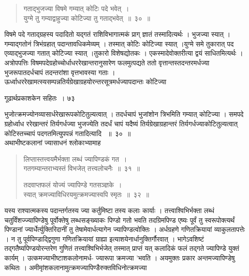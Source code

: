 \documentclass[11pt, openany]{book}
\begin{document}
\begin{quote}
{\ssi गताद्भुजज्या विषमे गम्यात् कोटिः पदे भवेत्~।\\
युग्मे तु गम्याद्वाहुज्या कोटिज्या तु गताद्भवेत्~॥~३०~॥ }
\end{quote}

\begin{sloppypar}
विषमे पदे गताद्ग्रहस्य पदादितो यद्गतं राशिविभागात्मकं प्राग् ज्ञातं तस्मादित्यर्थः । भुजज्या स्यात् । गम्याद्गतोनं त्रिभंग्रहात् पदान्तावधिकमेव्यम् । तस्मात् कोटिः कोटिज्या स्यात् ।युग्मे समे तुकारात् पद एव्याद्भुजज्या गतात् कोटिज्या स्यात् ।तुकारो विशेषद्योतकः । एकस्मादेवोक्तरीत्या द्वयं साधितमित्यर्थः । अत्रोपपत्तिः \textendash विषमपदेग्रहोच्चोर्धाधररेखान्तरानुसारेण फलमुत्पद्यते ततो वृत्तान्तस्तदन्तरमर्धज्या भुजरूपातदर्धचापं तदन्तरांशा वृत्तभावस्या गताः । ऊर्ध्वाधररेखामत्स्यसम्पन्नतिर्यग्रेखाग्रहयोरन्तरसूत्रमर्धज्यापदान्तः कोटिज्या
\end{sloppypar}

\newpage

\hspace{3cm}गूढार्थप्रकाशकेन सहितः~। \hfill ७३
\vspace{1cm}

\begin{sloppypar}

\noindent भुजोत्क्रमज्योनव्यासार्धरेखारूपकोटितुल्यत्वात् । तदर्धचापं भुजांशोन त्रिभमिति गम्यात् कोटिज्या । समपदे ग्रहोर्ध्वाध ररेखान्तरं तिर्यगर्धज्या भुजज्येति तदर्धं चापं यदैष्यं तिर्यग्रेखाग्रहान्तरं तिर्यगर्धज्याकोटितुल्यत्वात् कोटिस्तच्चापं पदगतमित्युपपन्नं गतादित्यादि ~॥~३०~॥\\ 
\noindent अथाभीष्टकलानां ज्यासाधनं श्लोकाभ्यामाह\textendash
\end{sloppypar}
\begin{quote}

{\ssi लिप्तास्तत्त्वयमैर्भक्ता लब्धं ज्यापिण्डकं गत~।\\
गतगम्यान्तराभ्यस्तं विभजेत् तत्त्वलोचनैः~॥~३१~॥

तदवाप्तफलं योज्यं ज्यापिण्डे गतसञ्ज्ञके~।\\
स्यात् क्रमज्याविधिरयमुत्क्रमज्यास्वपि स्मृतः~॥~३२~॥ }
\end{quote}
\begin{sloppypar}
यस्य राश्यात्मकस्य पदान्तर्गतस्य ज्या कर्तुमिष्टा तस्य कलाः कार्याः । तत्त्वाश्विभिर्भक्ता लब्धं चतुर्विंशज्ज्यापिण्डेषु पूर्वोक्तेषु लब्धसङ्ख्याकः पिण्डो गतो भवति तदग्रिमपिण्ड एष्यः पूर्वं तु स्वरूपोक्त्यर्थं पिण्डानां ज्यार्धेर्त्युक्तिरिदानीं तु तेषामेवार्धत्यागेन ज्यापिण्डत्वोक्तिः । अर्धग्रहणे गणितक्रियायां व्याकुलतापत्तेः । न तु पूर्वपिण्डाद्द्विगुणा गणितक्रियायां ग्राह्या इत्याशयेनार्धानुक्तिर्गौरवात् । भागेऽवशिष्टं तद्गतैष्यपिण्डयोरन्तरेण गुणितं तत्त्वाश्विभिर्भजेत् तस्मात् प्राप्तं यत् कलादिकं फलं तद्गते ज्यापिण्डे युक्तं कार्यम् । उत्कमज्याभीष्टाशकलोनामर्ध- ज्यारूपा क्रमज्या 'भवति । अयमुक्तः प्रकार अन्तमज्यापिण्डेषु कथितः । अमीमृांशकलानामुत्क्रमज्यापिण्डैरुक्तविधिनोत्क्रमज्या
\end{sloppypar}
\end{document}
